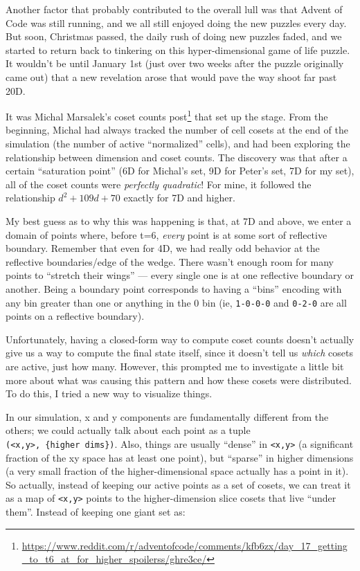 \documentclass[]{article}
\renewcommand{\href}[2]{#2\footnote{\url{#1}}}
\begin{document}
Another factor that probably contributed to the overall lull was that Advent of
Code was still running, and we all still enjoyed doing the new puzzles every
day. But soon, Christmas passed, the daily rush of doing new puzzles faded, and
we started to return back to tinkering on this hyper-dimensional game of life
puzzle. It wouldn't be until January 1st (just over two weeks after the puzzle
originally came out) that a new revelation arose that would pave the way shoot
far past 20D.

It was
\href{https://www.reddit.com/r/adventofcode/comments/kfb6zx/day_17_getting_to_t6_at_for_higher_spoilerss/ghre3ce/}{Michal
Marsalek's coset counts post} that set up the stage. From the beginning, Michal
had always tracked the number of cell cosets at the end of the simulation (the
number of active ``normalized'' cells), and had been exploring the relationship
between dimension and coset counts. The discovery was that after a certain
``saturation point'' (6D for Michal's set, 9D for Peter's set, 7D for my set),
all of the coset counts were \emph{perfectly quadratic}! For mine, it followed
the relationship \(d^2 + 109d + 70\) exactly for 7D and higher.

My best guess as to why this was happening is that, at 7D and above, we enter a
domain of points where, before t=6, \emph{every} point is at some sort of
reflective boundary. Remember that even for 4D, we had really odd behavior at
the reflective boundaries/edge of the wedge. There wasn't enough room for many
points to ``stretch their wings'' --- every single one is at one reflective
boundary or another. Being a boundary point corresponds to having a ``bins''
encoding with any bin greater than one or anything in the 0 bin (ie,
\texttt{1-0-0-0} and \texttt{0-2-0} are all points on a reflective boundary).

Unfortunately, having a closed-form way to compute coset counts doesn't actually
give us a way to compute the final state itself, since it doesn't tell us
\emph{which} cosets are active, just how many. However, this prompted me to
investigate a little bit more about what was causing this pattern and how these
cosets were distributed. To do this, I tried a new way to visualize things.

In our simulation, x and y components are fundamentally different from the
others; we could actually talk about each point as a tuple
\texttt{(\textless{}x,y\textgreater{},\ \{higher\ dims\})}. Also, things are
usually ``dense'' in \texttt{\textless{}x,y\textgreater{}} (a significant
fraction of the xy space has at least one point), but ``sparse'' in higher
dimensions (a very small fraction of the higher-dimensional space actually has a
point in it). So actually, instead of keeping our active points as a set of
cosets, we can treat it as a map of \texttt{\textless{}x,y\textgreater{}} points
to the higher-dimension slice cosets that live ``under them''. Instead of
keeping one giant set as:
\end{document}
